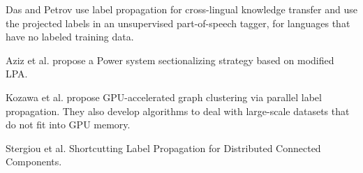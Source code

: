 {Das and Petrov \cite{das2011unsupervised} use label propagation for cross-lingual knowledge transfer and use the projected labels in an unsupervised part-of-speech tagger, for languages that have no labeled training data.

Aziz et al. \cite{aziz2023novel} propose a Power system sectionalizing strategy based on modified LPA.

Kozawa et al. \cite{kozawa2017gpu} propose GPU-accelerated graph clustering via parallel label propagation. They also develop algorithms to deal with large-scale datasets that do not fit into GPU memory.

Stergiou et al. \cite{stergiou2018shortcutting} Shortcutting Label Propagation for Distributed Connected Components.
}
